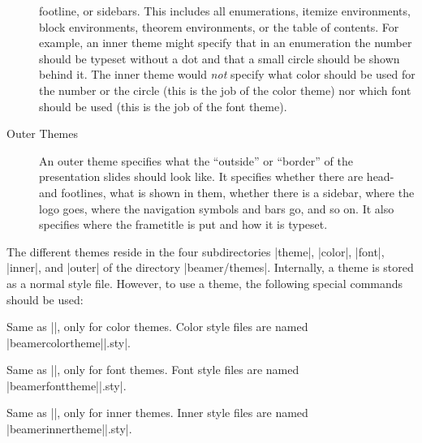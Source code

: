 \begin{description}
  footline, or sidebars. This includes all enumerations, itemize
  environments, block environments, theorem environments, or the table of
  contents. For example, an inner theme might
  specify that in an enumeration the number should be typeset without
  a dot and that a small circle should be shown behind it. The inner
  theme would \emph{not} specify what color should be used for the
  number or the circle (this is the job of the color theme) nor which font
  should be used (this is the job of the font theme).
\item[Outer Themes]
  An outer theme specifies what the ``outside'' or ``border'' of the
  presentation slides should look like. It specifies whether there are
  head- and footlines, what is shown in them, whether there is a
  sidebar, where the logo goes, where the navigation symbols and bars
  go, and so on. It also specifies where the frametitle is put and how
  it is typeset. 
\end{description}

The different themes reside in the four subdirectories |theme|, |color|,
|font|, |inner|, and |outer| of the directory
|beamer/themes|. Internally, a theme is stored as a normal style
file. However, to use a theme, the following special commands should
be used:



\begin{command}{\usecolortheme{}}
  Same as |\usetheme|, only for color themes. Color style files
  are named |beamercolortheme||.sty|.
\end{command}

\begin{command}{\usefonttheme{}}
  Same as |\usetheme|, only for font themes. Font style files
  are named |beamerfonttheme||.sty|.
\end{command}

\begin{command}{\useinnertheme{}}
  Same as |\usetheme|, only for inner themes. Inner style files
  are named |beamerinnertheme||.sty|.
\end{command}

